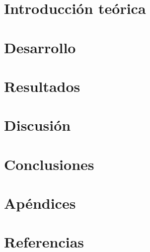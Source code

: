 \documentclass[a4paper]{article}
\begin{document}
\newpage

\tableofcontents

\medskip

\newpage
\graphicspath{{graficos/}}

\section{Introducción teórica}

\vspace{0.5cm}

\clearpage

\section{Desarrollo}

\vspace{0.5cm}

\clearpage

\section{Resultados}

\vspace{0.5cm}

\clearpage

\section{Discusión}

\vspace{0.5cm}

\clearpage

\section{Conclusiones}

\vspace{0.5cm}

\clearpage

\section{Apéndices}

\vspace{0.5cm}

\clearpage

\section{Referencias}

\vspace{0.5cm}
\end{document}
